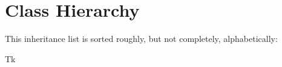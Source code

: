 \section{Class Hierarchy}
This inheritance list is sorted roughly, but not completely, alphabetically\+:\begin{DoxyCompactList}
\item Tk\begin{DoxyCompactList}
\item {}
\end{DoxyCompactList}
\end{DoxyCompactList}
